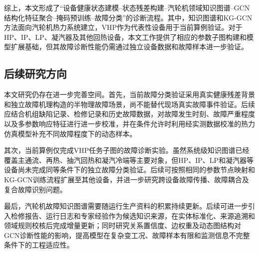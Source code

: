 综上，本文形成了“设备健康状态建模--状态残差构建--汽轮机领域知识图谱--GCN结构化特征聚合--掩码预训练--故障分类”的诊断流程。其中，知识图谱和KG-GCN方法面向汽轮机热力系统建立，VHP作为代表性设备用于当前算例验证。对于HP、IP、LP、凝汽器及其他回热设备，本文工作提供了相应的参数子图构建和模型扩展基础，但其故障诊断性能仍需通过独立设备数据和故障样本进一步验证。

\subsection{后续研究方向}

本文研究仍存在进一步完善空间。首先，当前故障分类验证采用真实健康残差背景和独立故障机理构造的半物理故障场景，尚不能替代现场真实故障事件验证。后续应结合机组缺陷记录、检修记录和历史故障数据，对故障发生时刻、故障严重程度以及多参数响应特征进行进一步校准，并在条件允许时利用经实测数据校准的热力仿真模型补充不同故障程度下的动态样本。

其次，当前算例仅完成VHP任务子图的故障诊断实验。虽然系统级知识图谱已经覆盖主通流、再热、抽汽回热和凝汽冷端等主要对象，但HP、IP、LP和凝汽器等设备尚未完成同等条件下的独立故障分类验证。后续可按照相同的参数节点映射和KG-GCN训练流程扩展至其他设备，并进一步研究跨设备故障传播、故障耦合及复合故障识别问题。

最后，汽轮机故障知识图谱需要随运行生产资料的积累持续更新。后续可进一步引入检修报告、运行日志和专家经验作为候选知识来源，在实体标准化、来源追溯和领域规则校核后完成增量更新；同时研究关系置信度、边权重及动态图结构对GCN诊断性能的影响，提高模型在复杂变工况、故障样本有限和监测信息不完整条件下的工程适应性。
